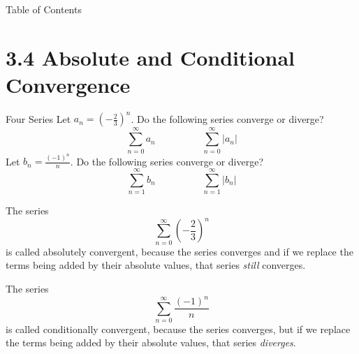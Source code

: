 

 \begin{frame}{Table of Contents }
\mapofcontentsC{\cd}
 \end{frame}
\section{3.4 Absolute and Conditional Convergence}
\begin{frame}[t]{Four Series}
\AnswerSpace
Let $a_n = \left(-\frac{2}{3}\right)^n$. Do the following series converge or diverge?
\[\sum_{n=0}^\infty a_n \hspace{2cm} \sum_{n=0}^\infty |a_n|\]
\vfill
Let $b_n = \frac{(-1)^n}{n}$. Do the following series converge or diverge?
\[\sum_{n=1}^\infty b_n \hspace{2cm} \sum_{n=1}^\infty |b_n|\]
\end{frame}
\begin{frame}[t]
The series
\[\sum_{n=0}^\infty \left(-\frac23\right)^n\]
is called \alert{absolutely convergent}, because the series converges and if we replace the terms being added by their absolute values, that series \textit{still} converges.

\vfill

The series
\[\sum_{n=0}^\infty\frac{(-1)^n}{n}\]
is called \alert{conditionally convergent}, because the series converges, but  if we replace the terms being added by their absolute values, that series \textit{diverges}.
\end{frame}

